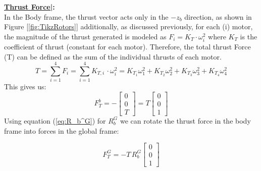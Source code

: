 \documentclass[conf]{new-aiaa}
\begin{document}
\noindent\textbf{ \ul{Thrust Force|}:}\vspace{0.22 cm}\\
In the Body frame, the thrust vector acts only in the $-z_b$ direction, as shown in Figure [\ref{fig:TikzRotors}] additionally, as discussed previously, for each (i) motor, the magnitude of the thrust generated is modeled as $F_i = K_T\cdot\omega_i^2$ where $K_T$ is the coefficient of thrust (constant for each motor). Therefore, the total thrust Force (T) can be defined as the sum of the individual thrusts of each motor. \begin{equation}
    T=\sum^4_{i=1}F_i = \sum^4_{i=1}K_{T,i}\,\cdot\omega_i^2 = K_{T_1}\omega^2_1+K_{T_2}\omega^2_2+K_{T_3}\omega^2_3+K_{T_4}\omega^2_4
    \label{eq:T}
\end{equation}
This gives us:
$$F_T^b  = -\begin{bmatrix}
    0\\0\\T
\end{bmatrix} =T\begin{bmatrix}
    0\\0\\1
\end{bmatrix}  $$
Using equation (\ref{eq:R_b^G}) for $R_b^G$ we can rotate the thrust force in the body frame into forces in the global frame:

\begin{equation*}
    \boxed{F_T^G =-T\,R_b^G\begin{bmatrix}
    0\\0\\1
\end{bmatrix}}
\label{eq:F_T^G}
\end{equation*} 
\end{document}
